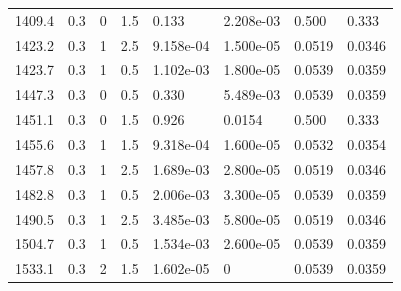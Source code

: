 \documentclass[preview]{standalone}
\begin{document}
{{{\begin{tabular}{L{1.2cm}C{1.2cm} C{0.3cm}C{0.5cm} C{1.4cm}C{1.4cm} C{1.4cm}C{1.4cm}}
  1409.4  &   0.3  & 0     & 1.5 &  0.133  & 2.208e-03  & 0.500 &  0.333   \\ 
  1423.2  &   0.3  & 1     & 2.5 &  9.158e-04  & 1.500e-05  & 0.0519 &  0.0346   \\ 
  1423.7  &   0.3  & 1     & 0.5 &  1.102e-03  & 1.800e-05  & 0.0539 &  0.0359   \\ 
  1447.3  &   0.3  & 0     & 0.5 &  0.330  & 5.489e-03  & 0.0539 &  0.0359   \\ 
  1451.1  &   0.3  & 0     & 1.5 &  0.926  & 0.0154  & 0.500 &  0.333   \\ 
  1455.6  &   0.3  & 1     & 1.5 &  9.318e-04  & 1.600e-05  & 0.0532 &  0.0354   \\ 
  1457.8  &   0.3  & 1     & 2.5 &  1.689e-03  & 2.800e-05  & 0.0519 &  0.0346   \\ 
  1482.8  &   0.3  & 1     & 0.5 &  2.006e-03  & 3.300e-05  & 0.0539 &  0.0359   \\ 
  1490.5  &   0.3  & 1     & 2.5 &  3.485e-03  & 5.800e-05  & 0.0519 &  0.0346   \\ 
  1504.7  &   0.3  & 1     & 0.5 &  1.534e-03  & 2.600e-05  & 0.0539 &  0.0359   \\ 
  1533.1  &   0.3  & 2     & 1.5 &  1.602e-05  & 0  & 0.0539 &  0.0359   \\ 
\hline 
\end{tabular} 

}}}
\end{document}
